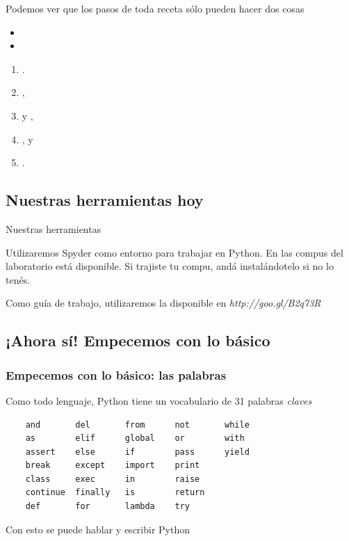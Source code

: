\documentclass{beamer}
\begin{document}
\begin{frame}[fragile]
    Podemos ver que los pasos de toda receta sólo pueden hacer dos cosas

    \begin{itemize}
        \item{}
        \item{}
    \end{itemize}
    \vskip 20pt
    \begin{enumerate}
        \item {}.
        \item {},
        \item {} y ,
        \item {}, y
        \item {}.
    \end{enumerate}
    
    
\end{frame}

\subsection{Nuestras herramientas hoy}
\begin{frame}[fragile]{Nuestras herramientas}

Utilizaremos Spyder como entorno para trabajar en Python. En las compus del laboratorio está disponible. Si trajiste tu compu, andá instalándotelo si no lo tenés.

\vskip11pt

Como guía de trabajo, utilizaremos la disponible en \emph{http://goo.gl/B2q73R}

\end{frame}



\subsection{¡Ahora sí! Empecemos con lo básico}
\begin{frame}[fragile]
  \frametitle{Empecemos con lo básico: las palabras}
  Como todo lenguaje, Python tiene un vocabulario de 31 palabras \emph{claves}
  \begin{verbatim}
    and       del       from      not       while
    as        elif      global    or        with
    assert    else      if        pass      yield
    break     except    import    print
    class     exec      in        raise
    continue  finally   is        return 
    def       for       lambda    try
  \end{verbatim}
  Con esto se puede hablar y escribir Python
\end{frame}
\end{document}
